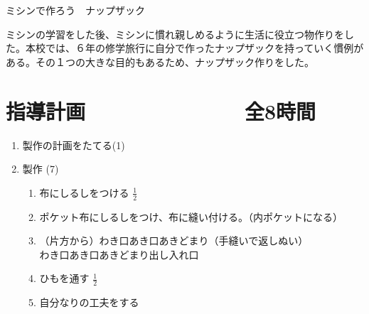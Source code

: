 \documentclass[a4paper,papersize,11pt]{jsarticle}
\begin{document}
\renewcommand{\theenumii}{\arabic{enumii}}
\renewcommand{\labelenumii}{\textcircled{\small{\theenumii}}}
\def\labelitemi{$\circ$}

\begin{center}
{\LARGE
ミシンで作ろう　ナップザック}
\end{center}

ミシンの学習をした後、ミシンに慣れ親しめるように生活に役立つ物作りをした。本校では、６年の修学旅行に自分で作ったナップザックを持っていく慣例がある。その１つの大きな目的もあるため、ナップザック作りをした。\vspace{-0.75zh}

\section{指導計画　　　　　　　　全8時間}
\begin{enumerate}
\item 製作の計画をたてる\dotfill (1)

\item 製作 \dotfill (7)
\begin{enumerate}
\item 布にしるしをつける \dotfill $\tfrac{1}{2}$
\item ポケット布にしるしをつけ、布に縫い付ける。（内ポケットになる） 
\item （片方から）\textrightarrow わき\textrightarrow 口あき\textrightarrow 口あきどまり（手縫いで返しぬい）\textrightarrow \\ わき\textrightarrow 口あき\textrightarrow 口あきどまり\textrightarrow 出し入れ口
\item ひもを通す \dotfill $\tfrac{1}{2}$
\item 自分なりの工夫をする 
\end{enumerate}
\end{enumerate}

\enlargethispage{2truecm}
\end{document}
